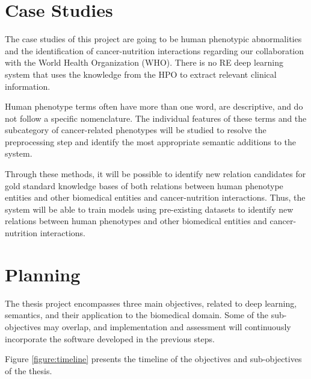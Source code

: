 \section{Case Studies}

The case studies of this project are going to be human phenotypic abnormalities and the identification of cancer-nutrition interactions regarding our collaboration with the World Health Organization (WHO). There is no RE deep learning system that uses the knowledge from the HPO \citep{robinson2010human} to extract relevant clinical information.

Human phenotype terms often have more than one word, are descriptive, and do not follow a specific nomenclature. The individual features of these terms and the subcategory of cancer-related phenotypes will be studied to resolve the preprocessing step and identify the most appropriate semantic additions to the system.  

Through these methods, it will be possible to identify new relation candidates for gold standard knowledge bases of both relations between human phenotype entities and other biomedical entities and cancer-nutrition interactions. Thus, the system will be able to train models using pre-existing datasets to identify new relations between human phenotypes and other biomedical entities and cancer-nutrition interactions.

\section{Planning}

The thesis project encompasses three main objectives, related to deep learning, semantics, and their application to the biomedical domain. Some of the sub-objectives may overlap, and implementation and assessment will continuously incorporate the software developed in the previous steps.

Figure \ref{figure:timeline} presents the timeline of the objectives and sub-objectives of the thesis.

